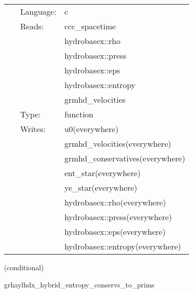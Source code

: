 \documentclass{article}
\begin{document}
\hspace{5mm}{\it entropy+hybrid version of grhaylhdx\_prims\_to\_conservs } 


\hspace{5mm}

 \begin{tabular*}{160mm}{cll} 
~ & Language:  & c \\ 
~ & Reads:  & ccc\_spacetime \\ 
~& ~ &hydrobasex::rho\\ 
~& ~ &hydrobasex::press\\ 
~& ~ &hydrobasex::eps\\ 
~& ~ &hydrobasex::entropy\\ 
~& ~ &grmhd\_velocities\\ 
~ & Type:  & function \\ 
~ & Writes:  & u0(everywhere) \\ 
~& ~ &grmhd\_velocities(everywhere)\\ 
~& ~ &grmhd\_conservatives(everywhere)\\ 
~& ~ &ent\_star(everywhere)\\ 
~& ~ &ye\_star(everywhere)\\ 
~& ~ &hydrobasex::rho(everywhere)\\ 
~& ~ &hydrobasex::press(everywhere)\\ 
~& ~ &hydrobasex::eps(everywhere)\\ 
~& ~ &hydrobasex::entropy(everywhere)\\ 
\end{tabular*} 


\vspace{5mm}

   (conditional) 

\hspace{5mm} grhaylhdx\_hybrid\_entropy\_conservs\_to\_prims 

\hspace{5mm}{\it entropy+hybrid version of grhaylhdx\_conservs\_to\_prims } 


\hspace{5mm}
\end{document}
